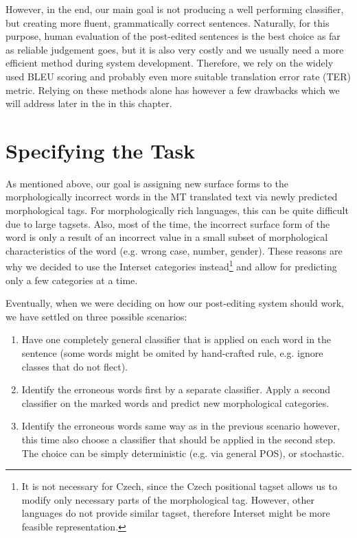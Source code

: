 However, in the end, our main goal is not producing a well performing classifier, but creating
more fluent, grammatically correct sentences.
Naturally, for this purpose, human evaluation of the post-edited sentences is the best choice as far
as reliable judgement goes, but it is also very costly and we usually need a more efficient
method during system development. Therefore, we rely on the widely used BLEU scoring and
probably even more suitable translation error rate (TER) metric. Relying on these methods alone
has however a few drawbacks which we will address later in the in this chapter.

\section{Specifying the Task}

As mentioned above, our goal is assigning new surface forms to the morphologically incorrect words
in the MT translated text via newly predicted morphological tags. For morphologically rich languages,
this can be quite difficult due to large tagsets. Also, most of the time,
the incorrect surface form of the word is only a result of an incorrect value in a small
subset of morphological characteristics of the word (e.g. wrong case, number, gender).
These reasons are why we decided to use the Interset categories instead\footnote{It is
not necessary for Czech, since the Czech positional tagset allows us to modify only necessary
parts of the morphological tag. However, other languages do not provide similar tagset, therefore
Interset might be more feasible representation.} and allow for predicting only a few categories at a time.

Eventually, when we were deciding on how our post-editing system should work, we have settled on three possible scenarios:
\begin{enumerate}
    \item Have one completely general classifier that is applied on each word in the sentence (some
        words might be omited by hand-crafted rule, e.g. ignore classes that do not flect).
    \item Identify the erroneous words first by a separate classifier. Apply a second classifier
        on the marked words and predict new morphological categories.
    \item Identify the erroneous words same way as in the previous scenario however, this time also choose a classifier that
        should be applied in the second step. The choice can be simply deterministic (e.g. via general POS), or stochastic.
\end{enumerate}

